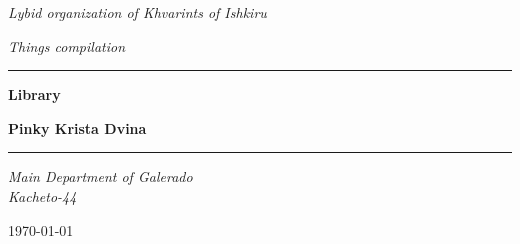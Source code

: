 \begin{titlepage}
    \centering

    \textit{\small Lybid organization of Khvarints of Ishkiru}
    \vfill

    \textit{\Large \sc Things compilation}
    \vspace{1 cm}\\
    \hrule height 1 pt \vspace{1cm}
    {\Huge\bfseries\sffamily Library} \bigskip\par
    {\Large\bfseries Pinky Krista Dvina} \bigskip\par
    \vspace{1cm} \hrule height 1 pt
    \vfill

    \begin{center}
        \it
        Main Department of Galerado\\
        Kacheto-44\\
    \end{center}
    \vfill

    \today
\end{titlepage}